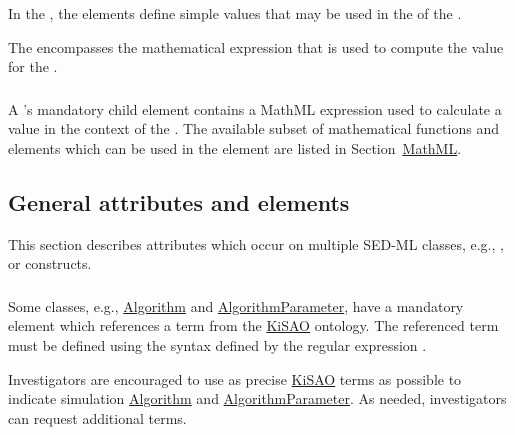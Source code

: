 \begin{blockChanged}
In the \ListOfParameters, the \Parameter elements define simple values that may be used in the \Math of the \Calculation.

The \Math encompasses the mathematical expression that is used to compute the value for the \Calculation.

\subsubsection{}
\label{sec:math}
A \Calculation's mandatory child element  contains a MathML expression used to calculate a value in the context of the \Calculation.  The available subset of mathematical functions and elements which can be used in the \Math element are listed in Section~\hyperref[sec:mathML]{MathML}.


\subsection{General attributes and elements}
This section describes attributes which occur on multiple SED-ML classes, e.g., \kisaoID, or \hyperref[class:listOf]{} constructs.
\label{sec:generalAttributes}

\end{blockChanged}
\subsubsection{}
\label{sec:kisaoid}
Some classes, e.g., \hyperref[class:algorithm]{Algorithm} and \hyperref[class:algorithmParameter]{AlgorithmParameter}, have a mandatory element   which references a term from the \hyperref[sec:kisao]{KiSAO} ontology. The referenced term must be defined using the syntax defined by the regular expression . 

Investigators are encouraged to use as precise \hyperref[sec:kisao]{KiSAO} terms as possible to indicate simulation \hyperref[class:algorithm]{Algorithm} and \hyperref[class:algorithmParameter]{AlgorithmParameter}. As needed, investigators can request additional terms.


